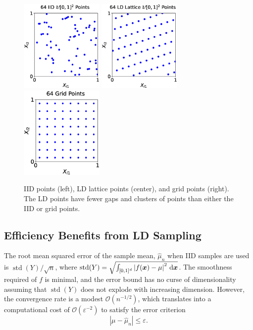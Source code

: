 \documentclass[11pt]{NSFamsart}
\DeclareMathOperator{\std}{std}
\newcommand{\cube}{[0,1]^d}
\newcommand{\bx}{{\boldsymbol{x}}}
\def\dif{\textup{d}}
\def\abs#1{\ensuremath{\left \lvert #1 \right \rvert}}
\newcommand{\Order}{\mathcal{O}}
\newcommand{\hmu}{\hat{\mu}}
\begin{document}
\begin{figure}[H]
	\centering
	\includegraphics[height = 4.5cm]{ProgramsImages/iid_scatter.eps} \quad
	\includegraphics[height = 4.5cm]{ProgramsImages/lattice_scatter.eps} \quad
	\includegraphics[height = 4.5cm]{ProgramsImages/grid_scatter.eps}
	\caption{IID points (left), LD lattice points (center), and grid points (right).  The LD points have fewer gaps and clusters of points than either the IID or grid points. \label{fig:iid_vs_ld}}
\end{figure}

\subsection{Efficiency Benefits from LD Sampling} \label{sec:eff_benefits}
The root mean squared error of the sample mean, $\hmu_n$ when IID samples are used is
$\std(Y)/\sqrt{n}$, where $\std(Y) = \sqrt{\int_{\cube} \abs{f(\bx) - \mu}^2 \, \dif \bx}$.  The smoothness required of $f$ is minimal, and the error bound has no curse of dimensionality assuming that $\std(Y)$ does not explode with increasing dimension.  However, the convergence rate is a modest $\Order(n^{-1/2})$, which translates into a computational cost of $\Order(\varepsilon^{-2})$ to satisfy the error criterion
\begin{equation} \label{eq:error_crit}
	\abs{\mu -\hmu_n} \le \varepsilon.
\end{equation}
\end{document}

